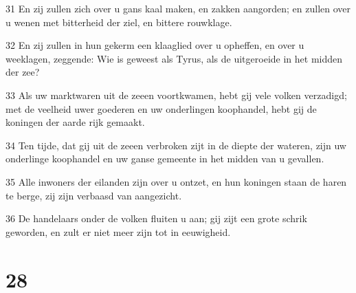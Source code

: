 \par 31 En zij zullen zich over u gans kaal maken, en zakken aangorden; en zullen over u wenen met bitterheid der ziel, en bittere rouwklage.
\par 32 En zij zullen in hun gekerm een klaaglied over u opheffen, en over u weeklagen, zeggende: Wie is geweest als Tyrus, als de uitgeroeide in het midden der zee?
\par 33 Als uw marktwaren uit de zeeen voortkwamen, hebt gij vele volken verzadigd; met de veelheid uwer goederen en uw onderlingen koophandel, hebt gij de koningen der aarde rijk gemaakt.
\par 34 Ten tijde, dat gij uit de zeeen verbroken zijt in de diepte der wateren, zijn uw onderlinge koophandel en uw ganse gemeente in het midden van u gevallen.
\par 35 Alle inwoners der eilanden zijn over u ontzet, en hun koningen staan de haren te berge, zij zijn verbaasd van aangezicht.
\par 36 De handelaars onder de volken fluiten u aan; gij zijt een grote schrik geworden, en zult er niet meer zijn tot in eeuwigheid.

\chapter{28}

